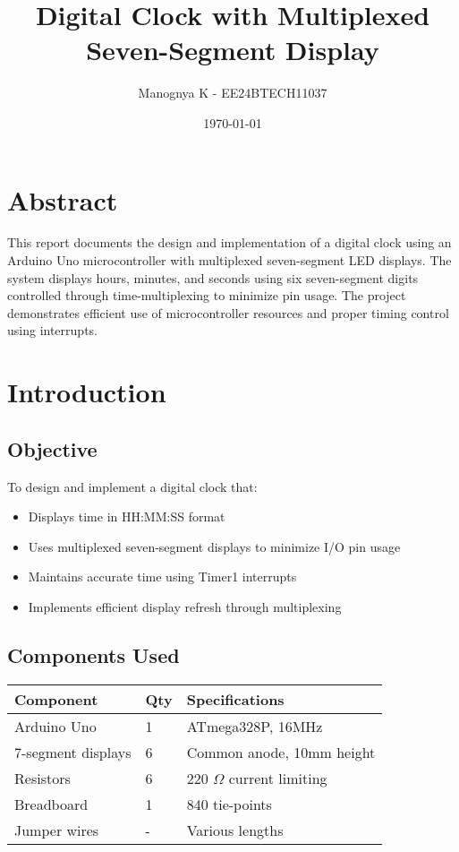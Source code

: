 \documentclass{article}
\title{Digital Clock with Multiplexed Seven-Segment Display}
\author{Manognya K - EE24BTECH11037}
\date{\today}
\begin{document}
\maketitle

\section{Abstract}
This report documents the design and implementation of a digital clock using an Arduino Uno microcontroller with multiplexed seven-segment LED displays. The system displays hours, minutes, and seconds using six seven-segment digits controlled through time-multiplexing to minimize pin usage. The project demonstrates efficient use of microcontroller resources and proper timing control using interrupts.

\section{Introduction}

\subsection{Objective}
To design and implement a digital clock that:
\begin{itemize}
\item Displays time in HH:MM:SS format
\item Uses multiplexed seven-segment displays to minimize I/O pin usage
\item Maintains accurate time using Timer1 interrupts
\item Implements efficient display refresh through multiplexing
\end{itemize}

\subsection{Components Used}
\begin{tabularx}{\linewidth}{|l|l|X|}
\hline
\textbf{Component} & \textbf{Qty} & \textbf{Specifications} \\ \hline
Arduino Uno & 1 & ATmega328P, 16MHz \\ \hline
7-segment displays & 6 & Common anode, 10mm height \\ \hline
Resistors & 6 & 220 $\Omega$ current limiting \\ \hline
Breadboard & 1 & 840 tie-points \\ \hline
Jumper wires & - & Various lengths \\ \hline
\end{tabularx}
\end{document}
